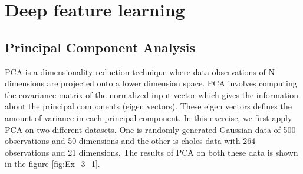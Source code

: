 \chapter{Deep feature learning}
\section{Principal Component Analysis}
PCA is a dimensionality reduction technique where data observations of N dimensions  are projected onto a lower dimension space. PCA involves computing the covariance matrix of the normalized input vector which gives the information about the principal components (eigen vectors). These eigen vectors defines the amount of variance in each principal component. In this exercise, we first apply PCA on two different datasets. One is randomly generated Gaussian data of 500 observations and 50 dimensions and the other is choles data with 264 observations and 21 dimensions. The results of PCA on both these data is shown in the figure \ref{fig:Ex_3_1}.\\

